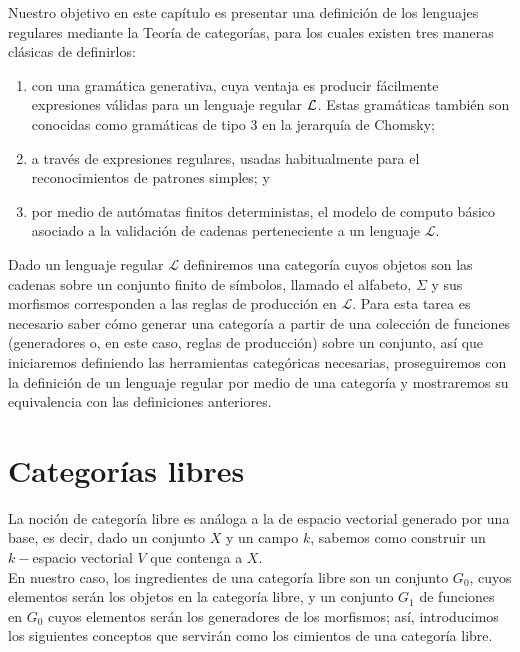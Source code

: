 \documentclass[../main.tex]{subfiles}
\begin{document}
Nuestro objetivo en este capítulo es presentar una definición de los lenguajes regulares mediante la Teoría de categorías, para los cuales existen tres maneras clásicas de definirlos:
\begin{enumerate}
    \item con una gramática generativa, cuya ventaja es producir fácilmente expresiones válidas para un lenguaje regular $\cal{L}$. Estas gramáticas también son conocidas como gramáticas de tipo 3 en la jerarquía de Chomsky;
    \item a través de expresiones regulares, usadas habitualmente para el reconocimientos de patrones simples; y
    \item por medio de autómatas finitos deterministas, el modelo de computo básico asociado a la validación de cadenas perteneciente a un lenguaje $\mathcal{L}$.
\end{enumerate}
Dado un lenguaje regular $\mathcal{L}$ definiremos una categoría cuyos objetos son las cadenas sobre un conjunto finito de símbolos, llamado el alfabeto, $\Sigma$ y sus morfismos corresponden a las reglas de producción en $\mathcal{L}$. Para esta tarea es necesario saber cómo generar una categoría a partir de una colección de funciones (generadores o, en este caso, reglas de producción) sobre un conjunto, así que iniciaremos definiendo las herramientas categóricas necesarias, proseguiremos con la definición de un lenguaje regular por medio de una categoría y mostraremos su equivalencia con las definiciones anteriores.  


\section{Categorías libres}
La noción de categoría libre es análoga a la de espacio vectorial generado por una base, es decir, dado un conjunto $X$ y un campo $k$, sabemos como construir un $k-$espacio vectorial $V$ que contenga a $X$. \\
En nuestro caso, los ingredientes de una categoría libre son un conjunto $G_0$, cuyos elementos serán los objetos en la categoría libre, y un conjunto $G_1$ de funciones en $G_0$ cuyos elementos serán los generadores de los morfismos; así, introducimos los siguientes conceptos que servirán como los cimientos de una categoría libre.  
\end{document}
